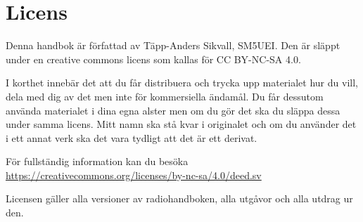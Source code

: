 
\section{Licens}

Denna handbok är författad av Täpp-Anders Sikvall, SM5UEI. Den är
släppt under en creative commons licens som kallas för CC BY-NC-SA 4.0.

I korthet innebär det att du får distribuera och trycka upp materialet
hur du vill, dela med dig av det men inte för kommersiella ändamål. Du
får dessutom använda materialet i dina egna alster men om du gör det
ska du släppa dessa under samma licens. Mitt namn ska stå kvar i
originalet och om du använder det i ett annat verk ska det vara
tydligt att det är ett derivat.

För fullständig information kan du besöka\\
\url{https://creativecommons.org/licenses/by-nc-sa/4.0/deed.sv}

Licensen gäller alla versioner av radiohandboken, alla utgåvor och
alla utdrag ur den.


